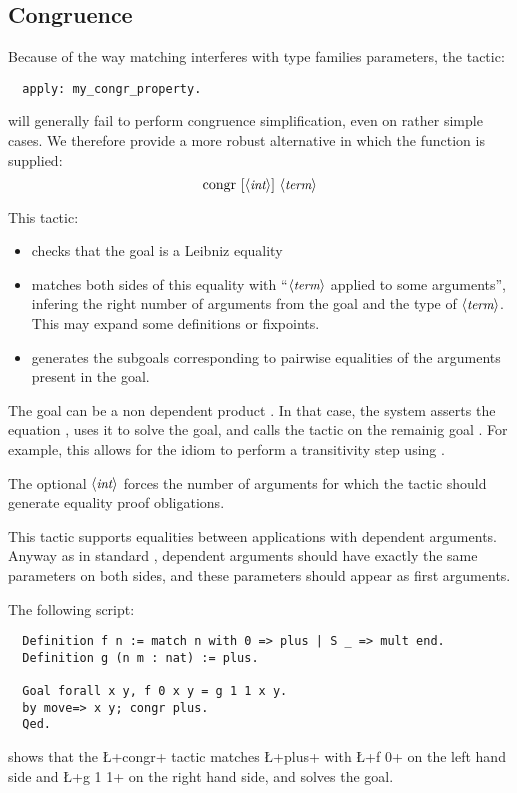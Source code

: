 \subsection{Congruence}\label{ssec:congr}

Because of the way matching interferes with type families parameters,
the tactic:
\begin{lstlisting}
  apply: my_congr_property.
\end{lstlisting}
will generally fail to perform congruence simplification, even on
rather simple cases. We therefore provide a
more robust alternative in which the function is supplied:
$$\C{congr}\ [\N{int}]\ \N{term}$$

This tactic:
\begin{itemize}
\item checks that the goal is a Leibniz equality
\item matches both sides of this equality with ``$\langle\mbox{\itshape\rmfamily\small term}\rangle$ applied to
  some arguments'', infering the right number of arguments from the goal
  and the type of $\langle\mbox{\itshape\rmfamily\small term}\rangle$. This may
  expand some definitions or fixpoints.
\item generates the subgoals corresponding to pairwise equalities of
  the arguments present in the goal.
\end{itemize}

The goal can be a non dependent product .
In that case, the system asserts the equation , uses it to solve
the goal, and calls the  tactic on the remainig goal 
. For example, 
this allows for the idiom  to perform a transitivity step
using .

The optional $\langle\mbox{\itshape\rmfamily\small int}\rangle$ forces the number of arguments for which the
tactic should generate equality proof obligations.

This tactic supports equalities between applications with dependent
arguments. Anyway as in standard
\Coq{}, dependent arguments should have exactly the same
parameters on both sides, and these parameters should appear as first
arguments.

The following script:
\begin{lstlisting}
  Definition f n := match n with 0 => plus | S _ => mult end.
  Definition g (n m : nat) := plus.

  Goal forall x y, f 0 x y = g 1 1 x y.
  by move=> x y; congr plus.
  Qed.
\end{lstlisting}
shows that the \L+congr+ tactic matches \L+plus+ with \L+f 0+ on the
left hand side and \L+g 1 1+ on the right hand side, and solves the goal.

